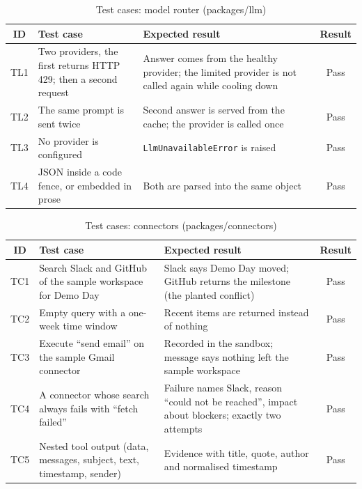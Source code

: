 \documentclass[oneside,a4paper,12pt]{report}
\begin{document}
\begin{table}[!htbp]
\begin{center}
\def\arraystretch{1.25}
\small
\begin{tabularx}{\textwidth}{| c | X | X | c |}
\hline
ID & Test case & Expected result & Result \\ \hline
TL1 & Two providers, the first returns HTTP 429; then a second request & Answer comes from the healthy provider; the limited provider is not called again while cooling down & Pass \\ \hline
TL2 & The same prompt is sent twice & Second answer is served from the cache; the provider is called once & Pass \\ \hline
TL3 & No provider is configured & \texttt{LlmUnavailableError} is raised & Pass \\ \hline
TL4 & JSON inside a code fence, or embedded in prose & Both are parsed into the same object & Pass \\ \hline
\end{tabularx}
\end{center}
\caption{Test cases: model router (packages/llm)}
\label{tab:test-llm}
\end{table}

\begin{table}[!htbp]
\begin{center}
\def\arraystretch{1.25}
\small
\begin{tabularx}{\textwidth}{| c | X | X | c |}
\hline
ID & Test case & Expected result & Result \\ \hline
TC1 & Search Slack and GitHub of the sample workspace for Demo Day & Slack says Demo Day moved; GitHub returns the milestone (the planted conflict) & Pass \\ \hline
TC2 & Empty query with a one-week time window & Recent items are returned instead of nothing & Pass \\ \hline
TC3 & Execute ``send email'' on the sample Gmail connector & Recorded in the sandbox; message says nothing left the sample workspace & Pass \\ \hline
TC4 & A connector whose search always fails with ``fetch failed'' & Failure names Slack, reason ``could not be reached'', impact about blockers; exactly two attempts & Pass \\ \hline
TC5 & Nested tool output (data, messages, subject, text, timestamp, sender) & Evidence with title, quote, author and normalised timestamp & Pass \\ \hline
\end{tabularx}
\end{center}
\caption{Test cases: connectors (packages/connectors)}
\label{tab:test-conn}
\end{table}
\end{document}
